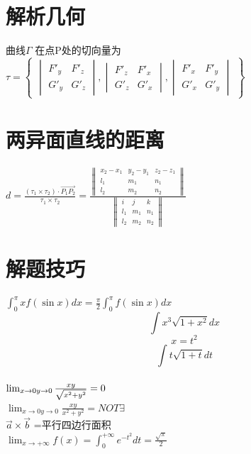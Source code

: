 \documentclass[UTF8]{ctexart}
\begin{document}
\section{解析几何}
曲线$\Gamma $ 在点P处的切向量为
$ \tau =
\begin{Bmatrix}

\begin{vmatrix}
F'_y & F'_z \\
G'_y & G'_z
\end{vmatrix}
,
\begin{vmatrix}
F'_z & F'_x \\
G'_z & G'_x
\end{vmatrix}
,
\begin{vmatrix}
F'_x & F'_y \\
G'_x & G'_y
\end{vmatrix}
\end{Bmatrix}
$

\section{两异面直线的距离}
$ d= \frac{ (\tau_1 \times \tau_2)\cdot \overrightarrow{P_1 P_2}}{\tau_1 \times \tau_2} = \frac{\begin{Vmatrix}
x_2-x_1 & y_2-y_1 & z_2-z_1 \\
l_1 & m_1 & n_1 \\
l_2 & m_2 & n_2
\end{Vmatrix}}{\begin{Vmatrix}
  i & j & k \\
  l_1 & m_1 & n_1 \\
  l_2 & m_2 & n_2
\end{Vmatrix}}
$

\section{解题技巧}
$\int_0^\pi xf(\sin x ) dx = \frac{\pi}{2} \int_0^\pi f(\sin x) dx$ \\
$$ \int x^3 \sqrt{1+x^2} dx$$
$$ x= t^2 $$
$$ \int t \sqrt{1+t} dt $$
\\
$\lim_{x\rightarrow 0 \\ y \rightarrow 0} \frac{xy}{\sqrt{x^2+y^2}}=0$ \\
$\lim_{x\rightarrow 0 y \rightarrow 0} \frac{xy}{x^2+y^2} = NOT \exists$
\\
$\overrightarrow{a}\times \overrightarrow{b}$ =平行四边行面积
\\
$ \lim_{x \rightarrow + \infty } f(x) = \int_0^{+ \infty } e^{-t^2} dt = \frac{\sqrt{\pi}}{2}$
\end{document}
